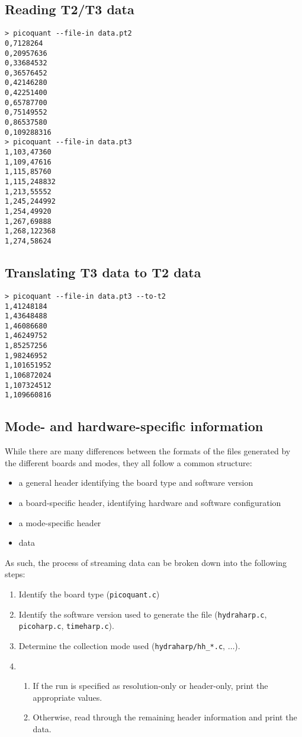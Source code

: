 \documentclass{article}
\begin{document}
\subsection{Reading T2/T3 data}
\begin{verbatim}
> picoquant --file-in data.pt2
0,7128264
0,20957636
0,33684532
0,36576452
0,42146280
0,42251400
0,65787700
0,75149552
0,86537580
0,109288316
> picoquant --file-in data.pt3
1,103,47360
1,109,47616
1,115,85760
1,115,248832
1,213,55552
1,245,244992
1,254,49920
1,267,69888
1,268,122368
1,274,58624
\end{verbatim}

\subsection{Translating T3 data to T2 data}
\begin{verbatim}
> picoquant --file-in data.pt3 --to-t2
1,41248184
1,43648488
1,46086680
1,46249752
1,85257256
1,98246952
1,101651952
1,106872024
1,107324512
1,109660816
\end{verbatim}

\subsection{Mode- and hardware-specific information}
\label{sec:formats}

While there are many differences between the formats of the files generated by the different boards and modes, they all follow a common structure:
\begin{itemize}
\item a general header identifying the board type and software version
\item a board-specific header, identifying hardware and software configuration
\item a mode-specific header
\item data
\end{itemize}

As such, the process of streaming data can be broken down into the following steps:
\begin{enumerate}
\item Identify the board type (\texttt{picoquant.c})
\item Identify the software version used to generate the file (\texttt{hydraharp.c}, \texttt{picoharp.c}, \texttt{timeharp.c}).
\item Determine the collection mode used (\texttt{hydraharp/hh\_*.c}, $\ldots$).
\item  \begin{enumerate}
  \item If the run is specified as resolution-only or header-only, print the appropriate values.
  \item Otherwise, read through the remaining header information and print the data.
  \end{enumerate}
\end{enumerate}
\end{document}
